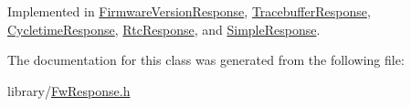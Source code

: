Implemented in \hyperlink{class_firmware_version_response_a5fc221081be8f4f5d7492719e00e0801}{Firmware\-Version\-Response}, \hyperlink{class_tracebuffer_response_ab845cfa616b5de2acf9c346d2ae02646}{Tracebuffer\-Response}, \hyperlink{class_cycletime_response_ac9ffd7b19849712f9fd6b9b9db1ae322}{Cycletime\-Response}, \hyperlink{class_rtc_response_a36b85321744707f72e911f2524b5c4ed}{Rtc\-Response}, and \hyperlink{class_simple_response_a9135714bbf726de9083678a684850d51}{Simple\-Response}.



The documentation for this class was generated from the following file\-:\begin{DoxyCompactItemize}
\item 
library/\hyperlink{_fw_response_8h}{Fw\-Response.\-h}\end{DoxyCompactItemize}
